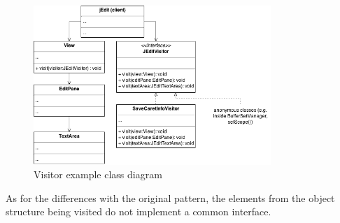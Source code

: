 \begin{figure}[h!]
    \includegraphics[width=0.8\textwidth]{images/visitor.png}
    \centering
    \caption{Visitor example class diagram}
\end{figure}

As for the differences with the original pattern, the elements from the object structure being visited do not implement a common interface.
\newpage
